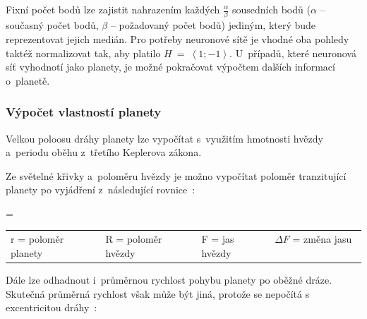 \documentclass[a4paper,12pt]{article}
\begin{document}
{{\begin{multicols}{2}
\nasa
\end{multicols}

Fixní počet bodů lze zajistit nahrazením každých $\frac{\alpha}{\beta}$ sousedních bodů ($\alpha$ -- současný počet bodů, $\beta$ -- požadovaný počet bodů) jediným, který bude reprezentovat jejich medián. Pro potřeby neuronové sítě je vhodné oba pohledy taktéž normalizovat tak, aby platilo $H~=~\left<1; -1\right>$. U~případů, které neuronová síť vyhodnotí jako planety, je možné pokračovat výpočtem dalších informací o~planetě.~\cite{kepler80}

\subsubsection{Výpočet vlastností planety}

Velkou poloosu dráhy planety lze vypočítat s~využitím hmotnosti hvězdy a~periodu oběhu z~třetího Keplerova zákona.~\cite{transitprops}


Ze světelné křivky a~poloměru hvězdy je možno vypočítat poloměr tranzitující planety po vyjádření z~následující rovnice~\cite{transit,transitprops}:

 { = }{
\begin{tabular}{llll}
	r = poloměr planety & R = poloměr hvězdy & F = jas hvězdy & $\Delta F$ = změna jasu \
\end{tabular}
}

Dále lze odhadnout i~průměrnou rychlost pohybu planety po oběžné dráze. Skutečná průměrná rychlost však může být jiná, protože se nepočítá s excentricitou dráhy~\cite{transitprops}:


}}
\end{document}
